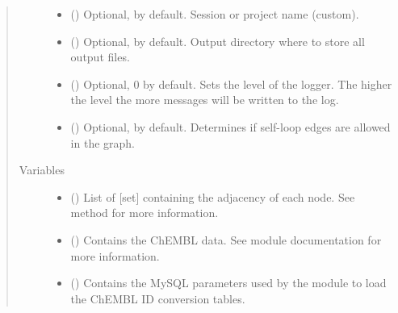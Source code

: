 \documentclass[letterpaper,10pt,english]{sphinxmanual}
\begin{document}
\begin{fulllineitems}
\begin{quote}
\begin{description}
\begin{itemize}
\item {} 
 () \textendash{} Optional,  by default. Session or project name
(custom).

\item {} 
 () \textendash{} Optional,  by default. Output directory where to
store all output files.

\item {} 
 () \textendash{} Optional, 0 by default. Sets the level of the logger.
The higher the level the more messages will be written to the log.

\item {} 
 () \textendash{} Optional,  by default. Determines if self-loop edges
are allowed in the graph.

\end{itemize}

\item[{Variables}] \leavevmode\begin{itemize}
\item {} 
 () \textendash{} List of {[}set{]} containing the adjacency of each node. See
{\hyperref[\detokenize{reference:pypath.main.PyPath.update_adjlist}]{}} method for more information.

\item {} 
 () \textendash{} Contains the ChEMBL data. See  module
documentation for more information.

\item {} 
 () \textendash{} Contains the MySQL parameters used by the
 module to load the ChEMBL ID conversion
tables.


\end{itemize}
\end{description}
\end{quote}
\end{fulllineitems}
\end{document}
